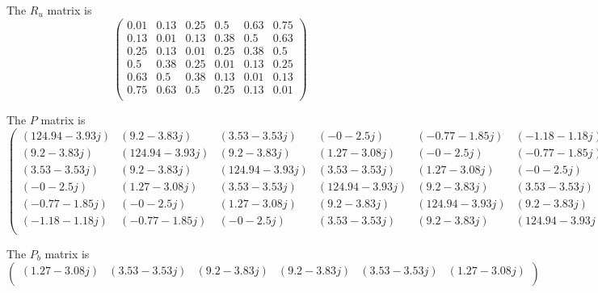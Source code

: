 \documentclass[12pt, a4paper]{report}
\begin{document}
 The $R_u$ matrix is 
\begin{equation*}
    \begin{pmatrix}
0.01 & 0.13 & 0.25 & 0.5 & 0.63 & 0.75\\
0.13 & 0.01 & 0.13 & 0.38 & 0.5 & 0.63\\
0.25 & 0.13 & 0.01 & 0.25 & 0.38 & 0.5\\
0.5 & 0.38 & 0.25 & 0.01 & 0.13 & 0.25\\
0.63 & 0.5 & 0.38 & 0.13 & 0.01 & 0.13\\
0.75 & 0.63 & 0.5 & 0.25 & 0.13 & 0.01\\
\end{pmatrix}
\end{equation*} 
\vspace{0.5cm}

The $P$ matrix is
\small
\begin{equation*}
    \begin{pmatrix}
(124.94-3.93j) & (9.2-3.83j) & (3.53-3.53j) & (-0-2.5j) & (-0.77-1.85j) & (-1.18-1.18j)\\
(9.2-3.83j) & (124.94-3.93j) & (9.2-3.83j) & (1.27-3.08j) & (-0-2.5j) & (-0.77-1.85j)\\
(3.53-3.53j) & (9.2-3.83j) & (124.94-3.93j) & (3.53-3.53j) & (1.27-3.08j) & (-0-2.5j)\\
(-0-2.5j) & (1.27-3.08j) & (3.53-3.53j) & (124.94-3.93j) & (9.2-3.83j) & (3.53-3.53j)\\
(-0.77-1.85j) & (-0-2.5j) & (1.27-3.08j) & (9.2-3.83j) & (124.94-3.93j) & (9.2-3.83j)\\
(-1.18-1.18j) & (-0.77-1.85j) & (-0-2.5j) & (3.53-3.53j) & (9.2-3.83j) & (124.94-3.93j)\\
\end{pmatrix}
\end{equation*}
\vspace{0.5cm}
\normalsize

The $P_b$ matrix is
\begin{equation*}
 \begin{pmatrix}
(1.27-3.08j) & (3.53-3.53j) & (9.2-3.83j) & (9.2-3.83j) & (3.53-3.53j) & (1.27-3.08j)\\
\end{pmatrix}
\end{equation*}
\vspace{0.5cm}
  
\end{document}
